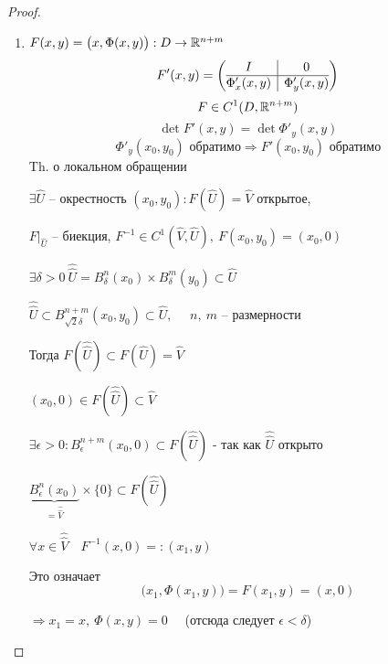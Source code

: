     \begin{proof}
        $ $
        \begin{enumerate}
            \item $F(x, y) = \big(x, \Phi(x, y)\big) : D \rightarrow \mathbb{R}^{n + m}$
                \[
                    F'(x, y) = \left(\begin{array}{@{}c|c@{}}
                        I & 0 \\
                        \hline
                        \Phi'_x(x, y) & \Phi'_y(x, y)
                      \end{array}\right)  
                \]
                \[
                      F \in C^1(D, \mathbb{R}^{n+m})
                \]
                \[
                      \det F'(x, y) = \det \Phi'_y(x, y)
                \]
                \[
                      \Phi'_y(x_0, y_0) \text{ обратимо} \Rightarrow F'(x_0, y_0) \text{ обратимо}
                \]
                Th. о локальном обращении
                \par $\exists \widehat U$ -- окрестность $(x_0, y_0) : F(\widehat U) = \widehat V$ открытое,
                \par $F\big|_{\widehat U}$ -- биекция, $F^{-1} \in C^1(\widehat V, \widehat U), \ F(x_0, y_0) = (x_0, 0)$
                \par $\exists \delta > 0 \ \widehat{\widehat U} = B_\delta^n(x_0) \times B_\delta^m(y_0) \subset \widehat U$
                \par $\widehat{\widehat U} \subset B_{\sqrt{2}\delta}^{n + m}(x_0, y_0) \subset \widehat{U}, \quad$ $n, \ m$ -- размерности
                \par Тогда $F(\widehat{\widehat U}) \subset F(\widehat U) = \widehat V$
                \par $(x_0, 0) \in F(\widehat{\widehat U}) \subset \widehat V$
                \par $\exists \epsilon > 0 : B_\epsilon^{n+m}(x_0, 0) \subset F(\widehat {\widehat U})$ - так как $\widehat {\widehat U} $ открыто
                \par $\underbrace{B^n_\epsilon(x_0)}_{= \widehat{\widehat V}} \times \{0\} \subset F(\widehat{\widehat U})$
                \par $\forall x \in \widehat{\widehat V} \quad F^{-1}(x, 0) =: (x_1, y)$
                \par Это означает
                \[
                      \big(x_1, \Phi(x_1, y)\big) = F(x_1, y) = (x, 0)
                \]
                \par $\Rightarrow x_1 = x, \ \Phi(x, y) = 0 \quad$ (отсюда следует $\epsilon < \delta$)

\end{enumerate}
\end{proof}
